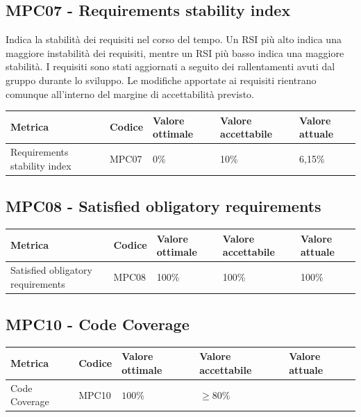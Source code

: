 \subsection{MPC07 - Requirements stability index}
\label{s:mpc07}
Indica la stabilità dei requisiti nel corso del tempo.
Un RSI più alto indica una maggiore instabilità dei requisiti, mentre un RSI più basso indica una maggiore stabilità.
I requisiti sono stati aggiornati a seguito dei rallentamenti avuti dal gruppo durante lo sviluppo.
Le modifiche apportate ai requisiti rientrano comunque all'interno del margine di accettabilità previsto.
\begin{table}[H]
    \centering
    \begin{tabularx}{\textwidth}{p{5.5cm}|X|l|l|l}
        \hline
		\textbf{Metrica} & \textbf{Codice} & \textbf{Valore ottimale} & \textbf{Valore accettabile}  & \textbf{Valore attuale} \\
        \hline
        Requirements stability index  & MPC07 & 0\% & 10\% & 6,15\% \\
    \end{tabularx}
\end{table}


\subsection{MPC08 - Satisfied obligatory requirements}
\label{s:mpc08}
\begin{table}[H]
    \centering
    \begin{tabularx}{\textwidth}{p{5.5cm}|X|l|l|l}
        \hline
		\textbf{Metrica} & \textbf{Codice} & \textbf{Valore ottimale} & \textbf{Valore accettabile}  & \textbf{Valore attuale} \\
        \hline
        Satisfied obligatory requirements  & MPC08 & 100\% & 100\% & 100\% \\
    \end{tabularx}
\end{table}


\subsection{MPC10 - Code Coverage}
\label{s:mpc10}
\begin{table}[H]
    \centering
    \begin{tabularx}{\textwidth}{p{5.5cm}|X|l|l|l}
        \hline
		\textbf{Metrica} & \textbf{Codice} & \textbf{Valore ottimale} & \textbf{Valore accettabile}  & \textbf{Valore attuale} \\
        \hline
        Code Coverage   & MPC10 & $100\%$   & $\ge 80\%$  & \\
    \end{tabularx}
\end{table}


